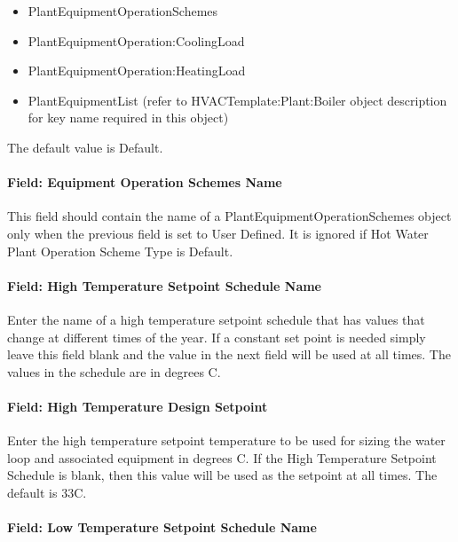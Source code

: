 \begin{itemize}
\item
  PlantEquipmentOperationSchemes
\item
  PlantEquipmentOperation:CoolingLoad
\item
  PlantEquipmentOperation:HeatingLoad
\item
  PlantEquipmentList (refer to HVACTemplate:Plant:Boiler object description for key name required in this object)
\end{itemize}

The default value is Default.

\paragraph{Field: Equipment Operation Schemes Name}\label{field-equipment-operation-schemes-name}

This field should contain the name of a PlantEquipmentOperationSchemes object only when the previous field is set to User Defined. It is ignored if Hot Water Plant Operation Scheme Type is Default.

\paragraph{Field: High Temperature Setpoint Schedule Name}\label{field-high-temperature-setpoint-schedule-name}

Enter the name of a high temperature setpoint schedule that has values that change at different times of the year. If a constant set point is needed simply leave this field blank and the value in the next field will be used at all times. The values in the schedule are in degrees C.

\paragraph{Field: High Temperature Design Setpoint}\label{field-high-temperature-design-setpoint}

Enter the high temperature setpoint temperature to be used for sizing the water loop and associated equipment in degrees C. If the High Temperature Setpoint Schedule is blank, then this value will be used as the setpoint at all times. The default is 33C.

\paragraph{Field: Low Temperature Setpoint Schedule Name}\label{field-low-temperature-setpoint-schedule-name}

